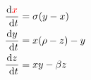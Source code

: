 \documentclass[preview]{standalone}
\begin{document}
\begin{center}
\[
            \begin{aligned}
            \frac{\mathrm{d} \color{red}{x}}{\mathrm{~d} t} & =\sigma(y-x) \\
            \frac{\mathrm{d} y}{\mathrm{~d} t} & = x(\rho-z)-y \\
            \frac{\mathrm{d} z}{\mathrm{~d} t} & = x y-\beta z
            \end{aligned}
            \]
\end{center}
\end{document}

